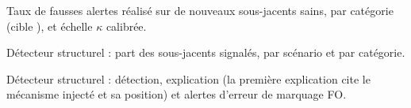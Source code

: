\begin{table}[H]
\centering
\caption{Taux de fausses alertes réalisé sur de nouveaux sous-jacents sains, par catégorie (cible \vFPR), et échelle
$\kappa$ calibrée.}\label{tab-fpr}

\end{table}

\begin{table}[H]
\centering
\caption{Détecteur structurel : part des sous-jacents signalés, par scénario et par catégorie.}\label{tab-bycat}

\end{table}

\begin{table}[H]
\centering
\caption{Détecteur structurel : détection, explication (la première explication cite le mécanisme injecté et sa
position) et alertes d'erreur de marquage FO.}\label{tab-attribution}

\end{table}

